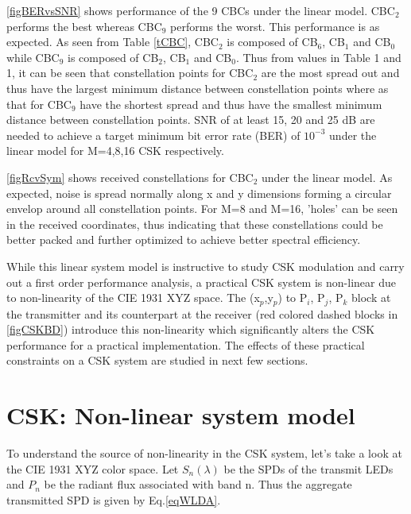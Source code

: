 \documentclass[10pt,letterpaper]{article}
\begin{document}
\figurename\ref{figBERvsSNR} shows performance of the 9 CBCs under the linear model. CBC$_{2}$ performs the best whereas CBC$_{9}$ performs the worst. This performance is as expected. As seen from Table \ref{tCBC}, CBC$_{2}$ is composed of CB$_{6}$, CB$_{1}$ and CB$_{0}$ while CBC$_{9}$ is composed of CB$_{2}$, CB$_{1}$ and CB$_{0}$. Thus from values in Table 1 and \figurename 1, it can be seen that constellation points for CBC$_{2}$ are the most spread out and thus have the largest minimum distance between constellation points where as that for CBC$_{9}$ have the shortest spread and thus have the smallest minimum distance between constellation points. SNR of at least 15, 20 and 25 dB are needed to achieve a target minimum bit error rate (BER) of $10^{-3}$ under the linear model for M=4,8,16 CSK respectively.

\figurename\ref{figRcvSym} shows received constellations for CBC$_{2}$ under the linear model. As expected, noise is spread normally along x and y dimensions forming a circular envelop around all constellation points. For M=8 and M=16, 'holes' can be seen in the received coordinates, thus indicating that these constellations could be better packed and further optimized to achieve better spectral efficiency.

While this linear system model is instructive to study CSK modulation and carry out a first order performance analysis, a practical CSK system is non-linear due to non-linearity of the CIE 1931 XYZ space. The (x$_{p}$,y$_{p}$) to P$_{i}$, P$_{j}$, P$_{k}$ block at the transmitter and its counterpart at the receiver (red colored dashed blocks in \figurename\ref{figCSKBD}) introduce this non-linearity which significantly alters the CSK performance for a practical implementation. The effects of these practical constraints on a CSK system are studied in next few sections.

\section{CSK: Non-linear system model}\label{sCSKNL}

To understand the source of non-linearity in the CSK system, let's take a look at the CIE 1931 XYZ color space. Let $S_{n}(\lambda)$ be the SPDs of the transmit LEDs and $P_{n}$ be the radiant flux associated with band n. Thus the aggregate transmitted SPD is given by Eq.\eqref{eqWLDA}.
\end{document}
